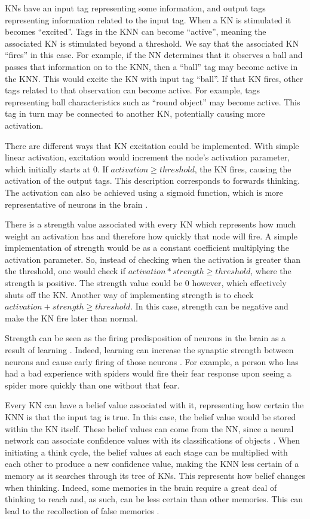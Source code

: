 \documentclass[titlepage,11pt]{article}
\begin{document}
KNs have an input tag representing some information, and output tags representing information related to the input tag. When a KN is stimulated it becomes ``excited''. Tags in the KNN can become ``active'', meaning the associated KN is stimulated beyond a threshold. We say that the associated KN ``fires'' in this case. For example, if the NN determines that it observes a ball and passes that information on to the KNN, then a ``ball'' tag may become active in the KNN. This would excite the KN with input tag ``ball''. If that KN fires, other tags related to that observation can become active. For example, tags representing ball characteristics such as ``round object'' may become active. This tag in turn may be connected to another KN, potentially causing more activation.

There are different ways that KN excitation could be implemented. With simple linear activation, excitation would increment the node's activation parameter, which initially starts at 0. If $activation \geq threshold$, the KN fires, causing the activation of the output tags. This description corresponds to forwards thinking. The activation can also be achieved using a sigmoid function, which is more representative of neurons in the brain \cite{neuro}.


There is a strength value associated with every KN which represents how much weight an activation has and therefore how quickly that node will fire. A simple implementation of strength would be as a constant coefficient multiplying the activation parameter. So, instead of checking when the activation is greater than the threshold, one would check if $activation * strength \geq threshold$, where the strength is positive. The strength value could be 0 however, which effectively shuts off the KN. Another way of implementing strength is to check $activation + strength \geq threshold$. In this case, strength can be negative and make the KN fire later than normal.

Strength can be seen as the firing predisposition of neurons in the brain as a result of learning \cite{vybihal-knowledge}. Indeed, learning can increase the synaptic strength between neurons and cause early  firing of those neurons \cite{hebb}. For example, a person who has had a bad experience with spiders would fire their fear response upon seeing a spider more quickly than one without that fear.

Every KN can have a belief value associated with it, representing how certain the KNN is that the input tag is true. In this case, the belief value would be stored within the KN itself. These belief values can come from the NN, since a neural network can associate confidence values with its classifications of objects \cite{mitchell1997machine}. When initiating a think cycle, the belief values at each stage can be multiplied with each other to produce a new confidence value, making the KNN less certain of a memory as it searches through its tree of KNs. This represents how belief changes when thinking. Indeed, some memories in the brain require a great deal of thinking to reach and, as such, can be less certain than other memories. This can lead to the recollection of false memories \cite{falsememories}.
\end{document}
